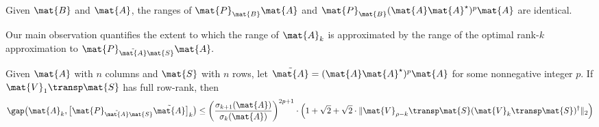 \begin{lemma}
Given $\mat{B}$ and $\mat{A}$, the ranges of $\mat{P}_{\mat{B}} \mat{A}$ and
$\mat{P}_{\mat{B}} (\mat{A} \mat{A}^\star)^p \mat{A}$ are identical.
\end{lemma}

Our main observation quantifies the extent to which the range of $\mat{A}_k$ is
approximated by the range of the optimal rank-$k$ approximation to
$\mat{P}_{\tilde{\mat{A}}\mat{S}} \mat{A}.$
\begin{thm}
Given $\mat{A}$ with $n$ columns and $\mat{S}$ with $n$ rows, let
$\tilde{\mat{A}} = (\mat{A}\mat{A}^\star)^p \mat{A}$ for some nonnegative
integer $p.$ If $\mat{V}_1\transp \mat{S}$ has full row-rank, then
\[
\gap\big(\mat{A}_k, \big[ \mat{P}_{\tilde{\mat{A}}\mat{S}} \tilde{\mat{A}}
\big]_k \big) \leq 
\left(\frac{\sigma_{k+1}(\mat{A})}{\sigma_k(\mat{A})}\right)^{2p+1} \cdot
\left(1 + \sqrt{2} + \sqrt{2} \cdot \|\mat{V}_{\rho - k}\transp \mat{S}
(\mat{V}_k\transp \mat{S})^\dagger\|_2 \right)
\]
\end{thm}

